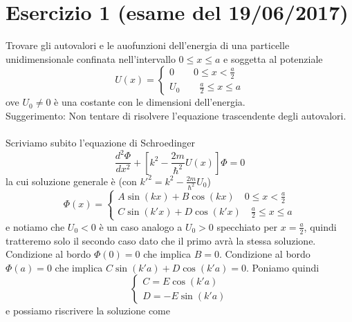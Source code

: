 \documentclass[a4paper]{article}
\begin{document}
    \section*{Esercizio 1 (esame del 19/06/2017)}
        Trovare gli autovalori e le auofunzioni dell'energia di una particelle unidimensionale confinata nell'intervallo $0\leq x\leq a$ e soggetta al potenziale
        \begin{equation*}
            U(x)=
            \begin{cases}
                0\quad\quad 0\leq x <\frac{a}{2}\\
                U_0\quad\quad \frac{a}{2}\leq x \leq a
            \end{cases}
        \end{equation*}
        ove $U_0\neq 0$ è una costante con le dimensioni dell'energia.
        \\
        Suggerimento: Non tentare di risolvere l'equazione trascendente degli autovalori.
        \\
        \\
        Scriviamo subito l'equazione di Schroedinger
        \begin{equation*}
            \frac{d^2\Phi}{dx^2}+\left[k^2-\frac{2m}{\hbar^2}U(x)\right]\Phi=0
        \end{equation*}
        la cui soluzione generale è (con $k'^2=k^2-\frac{2m}{\hbar^2}U_0$)
        \begin{equation*}
            \Phi(x)=
            \begin{cases}
                A\sin(kx)+B\cos(kx)\quad 0\leq x <\frac{a}{2}\\
                C\sin(k'x)+D\cos(k'x)\quad \frac{a}{2}\leq x \leq a
            \end{cases}
        \end{equation*}
        e notiamo che $U_0<0$ è un caso analogo a $U_0>0$ specchiato per $x=\frac{a}{2}$, quindi tratteremo solo il secondo caso dato che il primo avrà la stessa soluzione.
        Condizione al bordo $\Phi(0)=0$ che implica $B=0$.
        Condizione al bordo $\Phi(a)=0$ che implica $C\sin(k'a)+D\cos(k'a)=0$.
        Poniamo quindi
        \begin{equation*}
            \begin{cases}
                C=E\cos(k'a)\\
                D=-E\sin(k'a)
            \end{cases}
        \end{equation*}
        e possiamo riscrivere la soluzione come
\end{document}
